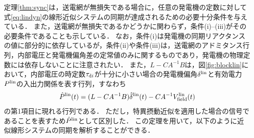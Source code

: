 \documentclass[a4j,10pt,oneside,openany,dvipdfmx]{jsbook}
\begin{document}
定理\ref{thm:sync}は，送電網が無損失である場合に，任意の発電機の定数に対して式\eqref{eq:lindyn}の線形近似システムの同期が達成されるための必要十分条件を与えている．
また，送電網が無損失であるかどうかに関わらず，条件(i)--(iii)がその必要条件であることも示している．
なお，条件(i)は発電機の同期リアクタンスの値に部分的に依存しているが，条件(ii)や条件(iii)は，送電網のアドミタンス行列，内部電圧と発電機偏角差の定常値のみに関するものであり，発電機の物理定数には依存しないことに注意されたい．
また，$L-CA^{-1}B$は，図\ref{fig:blocklin}において，内部電圧の時定数$\tau_{{\rm d}i}$が十分に小さい場合の発電機偏角$\delta^{\rm lin}$と有効電力$P^{\rm lin}$の入出力関係を表す行列，すなわち
\[
\hat{P}^{\rm lin}(t) = (L-CA^{-1}B) \hat{\delta}^{\rm lin}(t)
- C A^{-1} V^{\rm lin}_{\rm field}(t)
\]
の第1項目に現れる行列である．
ただし，特異摂動近似を適用した場合の信号であることを表すため$\hat{P}^{\rm lin}$として区別した．
この定理を用いて，以下のように近似線形システムの同期を解析することができる．
\end{document}
